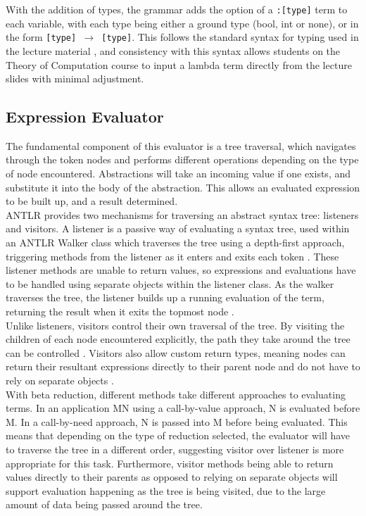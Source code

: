 \documentclass[a4paper,11pt]{report}
\begin{document}
With the addition of types, the grammar adds the option of a \texttt{:[type]} term to each variable, with each type being either a ground type (bool, int or none), or in the form \texttt{[type] $\rightarrow$ [type]}. This follows the standard syntax for typing used in the lecture material \cite{Hankin2004} \cite{Gay2019}, and consistency with this syntax allows students on the Theory of Computation course to input a lambda term directly from the lecture slides with minimal adjustment.

\subsection{Expression Evaluator}

The fundamental component of this evaluator is a tree traversal, which navigates through the token nodes and performs different operations depending on the type of node encountered. Abstractions will take an incoming value if one exists, and substitute it into the body of the abstraction. This allows an evaluated expression to be built up, and a result determined.\\

ANTLR provides two mechanisms for traversing an abstract syntax tree: listeners and visitors. A listener is a passive way of evaluating a syntax tree, used within an ANTLR Walker class which traverses the tree using a depth-first approach, triggering methods from the listener as it enters and exits each token \cite{Parr2012}. These listener methods are unable to return values, so expressions and evaluations have to be handled using separate objects within the listener class. As the walker traverses the tree, the listener builds up a running evaluation of the term, returning the result when it exits the topmost node \cite{Srivastav2017}.\\

Unlike listeners, visitors control their own traversal of the tree. By visiting the children of each node encountered explicitly, the path they take around the tree can be controlled \cite{Parr2012}. Visitors also allow custom return types, meaning nodes can return their resultant expressions directly to their parent node and do not have to rely on separate objects \cite{Srivastav2017}.\\

With beta reduction, different methods take different approaches to evaluating terms. In an application MN using a call-by-value approach, N is evaluated before M. In a call-by-need approach, N is passed into M before being evaluated. This means that depending on the type of reduction selected, the evaluator will have to traverse the tree in a different order, suggesting visitor over listener is more appropriate for this task. Furthermore, visitor methods being able to return values directly to their parents as opposed to relying on separate objects will support evaluation happening as the tree is being visited, due to the large amount of data being passed around the tree.\\
\end{document}
